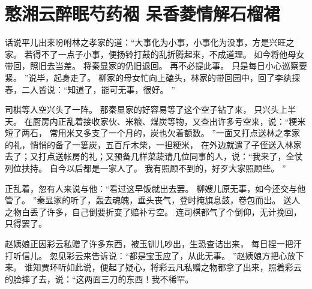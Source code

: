 \chapter{憨湘云醉眠芍药裀 \quad 呆香菱情解石榴裙}
\par
话说平儿出来吩咐林之孝家的道：“大事化为小事，小事化为没事，方是兴旺之家。
若得不了一点子小事，便扬铃打鼓的乱折腾起来，不成道理。
如今将他母女带回，照旧去当差。
将秦显家的仍旧退回。
再不必提此事。
只是每日小心巡察要紧。
”说毕，起身走了。
柳家的母女忙向上磕头，林家的带回园中，回了李纨探春，二人皆说：“知道了，能可无事，很好。
”\par
司棋等人空兴头了一阵。
那秦显家的好容易等了这个空子钻了来，
只兴头上半天。
在厨房内正乱着接收家伙、米粮、煤炭等物，又查出许多亏空来，说：“粳米短了两石，
常用米又多支了一个月的，炭也欠着额数。
”一面又打点送林之孝家的礼，悄悄的备了一篓炭，五百斤木柴，一担粳米，
在外边就遣了子侄送入林家去了；又打点送帐房的礼；又预备几样菜蔬请几位同事的人，说：“我来了，全仗列位扶持。
自今以后都是一家人了。
我有照顾不到的，好歹大家照顾些。
”\par
正乱着，忽有人来说与他：“看过这早饭就出去罢。
柳嫂儿原无事，如今还交与他管了。
”秦显家的听了，轰去魂魄，垂头丧气，登时掩旗息鼓，卷包而出。
送人之物白丢了许多，自己倒要折变了赔补亏空。
连司棋都气了个倒仰，无计挽回，只得罢了。
\par
赵姨娘正因彩云私赠了许多东西，被玉钏儿吵出，生恐查诘出来，
每日捏一把汗打听信儿。
忽见彩云来告诉说：“都是宝玉应了，从此无事。
”赵姨娘方把心放下来。
谁知贾环听如此说，便起了疑心，将彩云凡私赠之物都拿了出来，照着彩云的脸摔了去，说：“这两面三刀的东西！我不稀罕。
